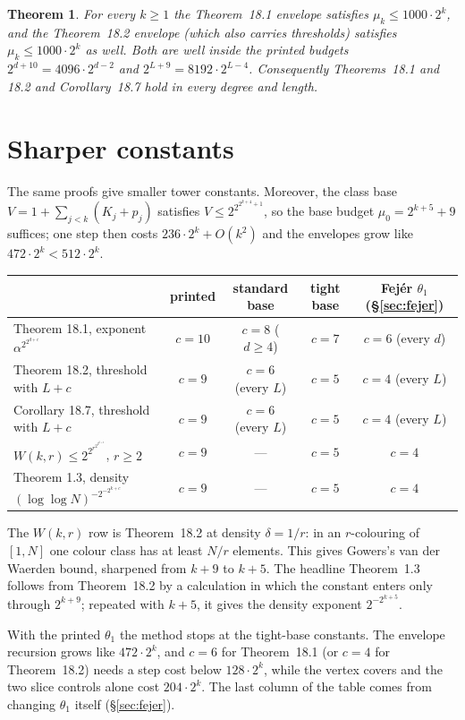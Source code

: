 \documentclass[11pt]{article}
\newtheorem{theorem}{Theorem}
\theoremstyle{definition}
\theoremstyle{remark}
\begin{document}
\begin{theorem}
For every $k\ge1$ the Theorem~18.1 envelope satisfies $\mu_k\le1000\cdot2^k$,
and the Theorem~18.2 envelope (which also carries thresholds) satisfies
$\mu_k\le1000\cdot2^k$ as well. Both are well inside the printed budgets
$2^{d+10}=4096\cdot2^{d-2}$ and $2^{L+9}=8192\cdot2^{L-4}$. Consequently
Theorems~18.1 and 18.2 and Corollary~18.7 hold in every degree and length.
\end{theorem}

\section{Sharper constants}

The same proofs give smaller tower constants. Moreover, the class base
$V=1+\sum_{j<k}(K_j+p_j)$ satisfies $V\le2^{2^{2^{k+4}+1}}$, so the base budget
$\mu_0=2^{k+5}+9$ suffices; one step then costs $236\cdot2^k+O(k^2)$ and the
envelopes grow like $472\cdot2^k<512\cdot2^k$.

\begin{center}\small
\begin{tabular}{lcccc}
\toprule
& printed & standard base & tight base & Fej\'er $\theta_1$ (\S\ref{sec:fejer})\\
\midrule
Theorem 18.1, exponent $\alpha^{2^{2^{d+c}}}$ & $c=10$ & $c=8$ ($d\ge4$) & $c=7$ & $c=6$ (every $d$)\\
Theorem 18.2, threshold with $L+c$ & $c=9$ & $c=6$ (every $L$) & $c=5$ & $c=4$ (every $L$)\\
Corollary 18.7, threshold with $L+c$ & $c=9$ & $c=6$ (every $L$) & $c=5$ & $c=4$ (every $L$)\\
$W(k,r)\le2^{2^{r^{2^{2^{k+c}}}}}$, $r\ge2$ & $c=9$ & --- & $c=5$ & $c=4$\\
Theorem 1.3, density $(\log\log N)^{-2^{-2^{k+c}}}$ & $c=9$ & --- & $c=5$ & $c=4$\\
\bottomrule
\end{tabular}
\end{center}

The $W(k,r)$ row is Theorem~18.2 at density $\delta=1/r$: in an $r$-colouring of
$[1,N]$ one colour class has at least $N/r$ elements. This gives Gowers's
van der Waerden bound, sharpened from $k+9$ to $k+5$. The headline
Theorem~1.3 follows from Theorem~18.2 by a calculation in which the constant
enters only through $2^{k+9}$; repeated with $k+5$, it gives the density
exponent $2^{-2^{k+5}}$.

With the printed $\theta_1$ the method stops at the tight-base constants. The
envelope recursion grows like $472\cdot2^k$, and $c=6$ for Theorem~18.1 (or
$c=4$ for Theorem~18.2) needs a step cost below $128\cdot2^k$, while the
vertex covers and the two slice controls alone cost $204\cdot2^k$. The last
column of the table comes from changing $\theta_1$ itself
(\S\ref{sec:fejer}).
\end{document}
